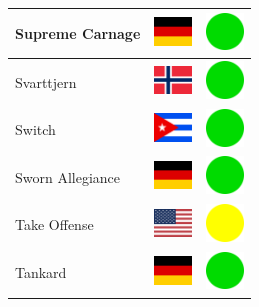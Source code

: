 \documentclass[12pt, a4paper, twoside]{report}
\begin{document}
\begin{center}
\begin{longtable}{|p{5cm}|p{2cm}|p{2cm}|}
 Supreme Carnage                                            & \includegraphics[width=1cm]{../4x3/de} &   \includegraphics[width=1cm]{../likes/y} \\ \hline
 Svarttjern                                                 & \includegraphics[width=1cm]{../4x3/no} &   \includegraphics[width=1cm]{../likes/y} \\ \hline
 Switch                                                     & \includegraphics[width=1cm]{../4x3/cu} &   \includegraphics[width=1cm]{../likes/y} \\ \hline
 Sworn Allegiance                                           & \includegraphics[width=1cm]{../4x3/de} &   \includegraphics[width=1cm]{../likes/y} \\ \hline
 Take Offense                                               & \includegraphics[width=1cm]{../4x3/us} &   \includegraphics[width=1cm]{../likes/m} \\ \hline
 Tankard                                                    & \includegraphics[width=1cm]{../4x3/de} &   \includegraphics[width=1cm]{../likes/y} \\ \hline

\end{longtable}
\end{center}
\end{document}
